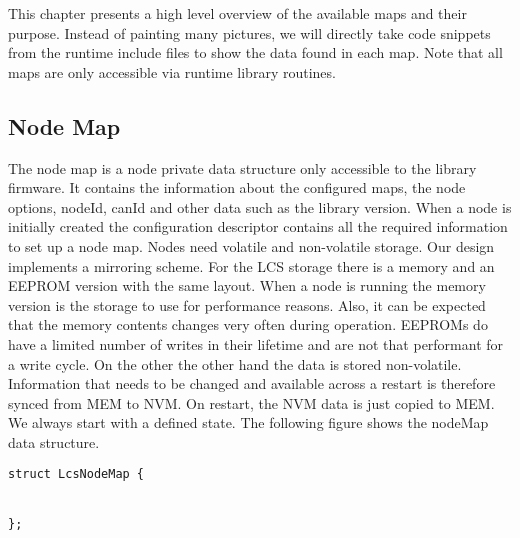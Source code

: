 \FloatBarrier

This chapter presents a high level overview of the available maps and their purpose. Instead of painting many pictures, we will directly take code snippets from the runtime include files to show the data found in each map. Note that all maps are only accessible via runtime library routines.

\subsection{Node Map}

The node map is a node private data structure only accessible to the library firmware. It contains the information about the configured maps, the node options, nodeId, canId and other data such as the library version. When a node is initially created the configuration descriptor contains all the required information to set up a node map. Nodes need volatile and non-volatile storage. Our design implements a mirroring scheme. For the LCS storage there is a memory and an EEPROM version with the same layout. When a node is running the memory version is the storage to use for performance reasons. Also, it can be expected that the memory contents changes very often during operation. EEPROMs do have a limited number of writes in their lifetime and are not that performant for a write cycle. On the other the other hand the data is stored non-volatile. Information that needs to be changed and available across a restart is therefore synced from MEM to NVM. On restart, the NVM data is just copied to MEM. We always start with a defined state. The following figure shows the nodeMap data structure.

\lstset{language=c++, style=codesnippetstyle}

\begin{center}
\begin{lstlisting}
struct LcsNodeMap {


};
\end{lstlisting}
\end{center}
\FloatBarrier

